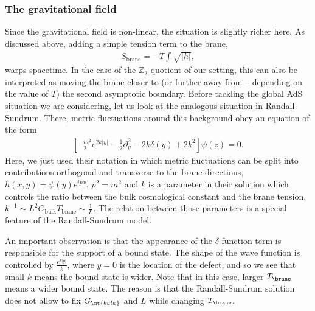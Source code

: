 \subsubsection{The gravitational field}
Since the gravitational field is non-linear, the situation is slightly richer here. As discussed above, adding a simple tension term to the brane,
\begin{align}
    S_\text{brane} = - T \int \sqrt{|h|}, 
\end{align}
warps spacetime. In the case of the $\mathbb Z_2$ quotient of our setting, this can also be interpreted as moving the brane closer to (or further away from -- depending on the value of $T$) the second asymptotic boundary. Before tackling the global AdS situation we are considering, let us look at the analogous situation in Randall-Sundrum. There, metric fluctuations around this background obey an equation of the form
\begin{align}
    \left[\frac{-m^2}{2} e^{2 k |y|} - \frac 1 2 \partial_y^2 - 2 k \delta(y) + 2 k^2 \right] \psi(z) = 0.
\end{align}
Here, we just used their notation in which metric fluctuations can be split into contributions orthogonal and transverse to the brane directions, $h(x,y) = \psi(y) e^{ipx}$, $p^2 = m^2$ and $k$ is a parameter in their solution which controls the ratio between the bulk cosmological constant and the brane tension, $k^{-1} \sim L^2 G_\text{bulk} T_\text{brane} \sim \frac 1 L$. The relation between those parameters is a special feature of the Randall-Sundrum model.

An important observation is that the appearance of the $\delta$ function term is responsible for the support of a bound state. The shape of the wave function is controlled by $\frac{e^{k|y|}}{k}$, where $y=0$ is the location of the defect, and so we see that small $k$ means the bound state is wider. Note that in this case, larger $T_\brane$ means a wider bound state. The reason is that the Randall-Sundrum solution does not allow to fix $G_\mt{bulk}$ and $L$ while changing $T_\brane$.

